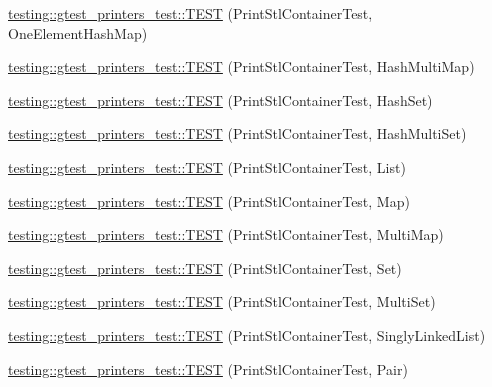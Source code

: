 \begin{DoxyCompactItemize}
\item 
\mbox{\hyperlink{namespacetesting_1_1gtest__printers__test_a698cb873ab0fad7484c4d27ee4d8c033}{testing\+::gtest\+\_\+printers\+\_\+test\+::\+T\+E\+ST}} (Print\+Stl\+Container\+Test, One\+Element\+Hash\+Map)
\item 
\mbox{\hyperlink{namespacetesting_1_1gtest__printers__test_a794a880a6ebe2ce3a32fc437dd818aa3}{testing\+::gtest\+\_\+printers\+\_\+test\+::\+T\+E\+ST}} (Print\+Stl\+Container\+Test, Hash\+Multi\+Map)
\item 
\mbox{\hyperlink{namespacetesting_1_1gtest__printers__test_aad3a8ebfcf21b20b62fc262cc182d7d5}{testing\+::gtest\+\_\+printers\+\_\+test\+::\+T\+E\+ST}} (Print\+Stl\+Container\+Test, Hash\+Set)
\item 
\mbox{\hyperlink{namespacetesting_1_1gtest__printers__test_aa21c6c92358c76b7eee93b8329023c47}{testing\+::gtest\+\_\+printers\+\_\+test\+::\+T\+E\+ST}} (Print\+Stl\+Container\+Test, Hash\+Multi\+Set)
\item 
\mbox{\hyperlink{namespacetesting_1_1gtest__printers__test_aaa135672ff79ecaef82c6046f2ab8d29}{testing\+::gtest\+\_\+printers\+\_\+test\+::\+T\+E\+ST}} (Print\+Stl\+Container\+Test, List)
\item 
\mbox{\hyperlink{namespacetesting_1_1gtest__printers__test_a3d701a1866f260a42411e9041894c49c}{testing\+::gtest\+\_\+printers\+\_\+test\+::\+T\+E\+ST}} (Print\+Stl\+Container\+Test, Map)
\item 
\mbox{\hyperlink{namespacetesting_1_1gtest__printers__test_a8a498c956a5b1c0358d126e1ad56fac0}{testing\+::gtest\+\_\+printers\+\_\+test\+::\+T\+E\+ST}} (Print\+Stl\+Container\+Test, Multi\+Map)
\item 
\mbox{\hyperlink{namespacetesting_1_1gtest__printers__test_abdc498462741033074f8e86b7c0bd480}{testing\+::gtest\+\_\+printers\+\_\+test\+::\+T\+E\+ST}} (Print\+Stl\+Container\+Test, Set)
\item 
\mbox{\hyperlink{namespacetesting_1_1gtest__printers__test_adaa3e1cfa3feca377b3958edb41fc0f1}{testing\+::gtest\+\_\+printers\+\_\+test\+::\+T\+E\+ST}} (Print\+Stl\+Container\+Test, Multi\+Set)
\item 
\mbox{\hyperlink{namespacetesting_1_1gtest__printers__test_a88b9d0933ffdf889fadfe8fc7511b565}{testing\+::gtest\+\_\+printers\+\_\+test\+::\+T\+E\+ST}} (Print\+Stl\+Container\+Test, Singly\+Linked\+List)
\item 
\mbox{\hyperlink{namespacetesting_1_1gtest__printers__test_ad5d3e873b00c1c9e3f5924e106dd7831}{testing\+::gtest\+\_\+printers\+\_\+test\+::\+T\+E\+ST}} (Print\+Stl\+Container\+Test, Pair)

\end{DoxyCompactItemize}
